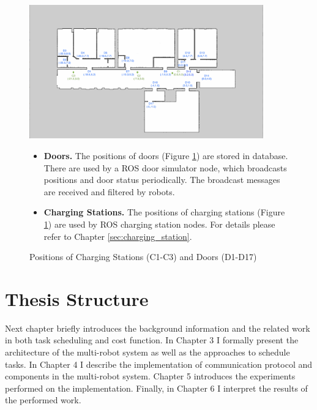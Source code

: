\begin{figure}[htbp]
	\centering
	\includegraphics[width = 0.9\textwidth]{content/images/ch3/positions_door_station.png}
	\caption{Positions of Charging Stations (C1-C3) and Doors (D1-D17)}
    \label{fig:positions_door_station}
    \begin{itemize}
        \item \textbf{Doors.} The positions of doors (Figure \ref{fig:positions_door_station}) are stored in database. There are used by a ROS door simulator node, which broadcasts positions and door status periodically. The broadcast messages are received and filtered by robots.
        \item \textbf{Charging Stations.} The positions of charging stations (Figure \ref{fig:positions_door_station}) are used by ROS charging station nodes. For details please refer to Chapter \ref{sec:charging_station}.
    \end{itemize}
\end{figure}


\section{Thesis Structure}
Next chapter briefly introduces the background information and the related work in both task scheduling and cost function.
In Chapter 3 I formally present the architecture of the multi-robot system as well as the approaches to schedule tasks. 
In Chapter 4 I describe the implementation of communication protocol and components in the multi-robot system.
Chapter 5 introduces the experiments performed on the implementation. 
Finally, in Chapter 6 I interpret the results of the performed work.